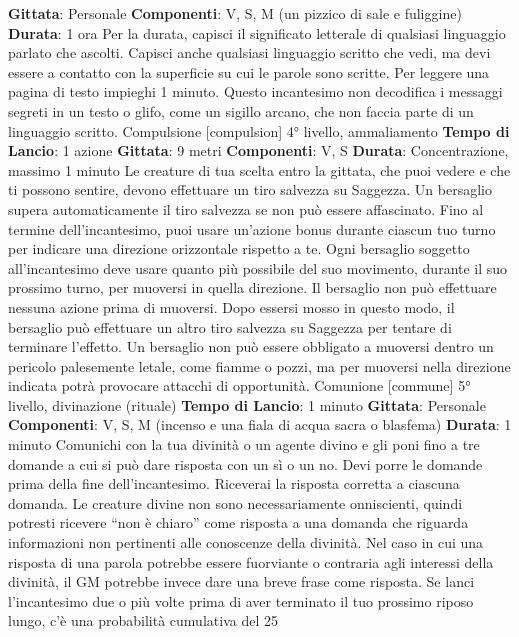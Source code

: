 \begin{multicols}{2}
\textbf{Gittata}: Personale
\textbf{Componenti}: V, S, M (un pizzico di sale e fuliggine)
\textbf{Durata}: 1 ora
Per la durata, capisci il significato letterale di qualsiasi
linguaggio parlato che ascolti. Capisci anche qualsiasi
linguaggio scritto che vedi, ma devi essere a contatto
con la superficie su cui le parole sono scritte. Per
leggere una pagina di testo impieghi 1 minuto.
Questo incantesimo non decodifica i messaggi segreti
in un testo o glifo, come un sigillo arcano, che non
faccia parte di un linguaggio scritto.
Compulsione
[compulsion]
4° livello, ammaliamento
\textbf{Tempo di Lancio}: 1 azione
\textbf{Gittata}: 9 metri
\textbf{Componenti}: V, S
\textbf{Durata}: Concentrazione, massimo 1 minuto
Le creature di tua scelta entro la gittata, che puoi
vedere e che ti possono sentire, devono effettuare un
tiro salvezza su Saggezza. Un bersaglio supera
automaticamente il tiro salvezza se non può essere
affascinato. Fino al termine dell’incantesimo, puoi usare
un’azione bonus durante ciascun tuo turno per indicare
una direzione orizzontale rispetto a te. Ogni bersaglio
soggetto all’incantesimo deve usare quanto più
possibile del suo movimento, durante il suo prossimo
turno, per muoversi in quella direzione. Il bersaglio non
può effettuare nessuna azione prima di muoversi. Dopo
essersi mosso in questo modo, il bersaglio può
effettuare un altro tiro salvezza su Saggezza per
tentare di terminare l’effetto.
Un bersaglio non può essere obbligato a muoversi
dentro un pericolo palesemente letale, come fiamme o
pozzi, ma per muoversi nella direzione indicata potrà
provocare attacchi di opportunità.
Comunione
[commune]
5° livello, divinazione (rituale)
\textbf{Tempo di Lancio}: 1 minuto
\textbf{Gittata}: Personale
\textbf{Componenti}: V, S, M (incenso e una fiala di acqua
sacra o blasfema)
\textbf{Durata}: 1 minuto
Comunichi con la tua divinità o un agente divino e gli
poni fino a tre domande a cui si può dare risposta con
un sì o un no. Devi porre le domande prima della fine
dell’incantesimo. Riceverai la risposta corretta a
ciascuna domanda.
Le creature divine non sono necessariamente
onniscienti, quindi potresti ricevere “non è chiaro” come
risposta a una domanda che riguarda informazioni non
pertinenti alle conoscenze della divinità. Nel caso in cui
una risposta di una parola potrebbe essere fuorviante o
contraria agli interessi della divinità, il GM potrebbe
invece dare una breve frase come risposta.
Se lanci l’incantesimo due o più volte prima di aver
terminato il tuo prossimo riposo lungo, c’è una
probabilità cumulativa del 25%

\end{multicols}
